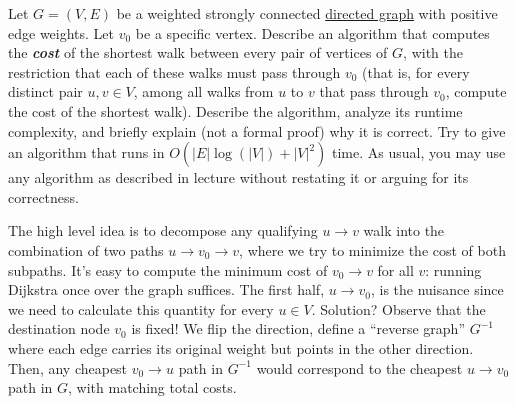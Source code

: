   \begin{exercise}
    Let $G = (V,E)$ be a weighted strongly connected \hyperref[def:directed-graph]{directed graph} with positive edge weights. Let $v_0$ be a specific vertex. Describe an algorithm that computes the \textbf{\textit{cost}} of the shortest walk between every pair of vertices of $G$, with the restriction that each of these walks must pass through $v_0$ (that is, for every distinct pair $u, v \in V$, among all walks from $u$ to $v$ that pass through $v_0$, compute the cost of the shortest walk). Describe the algorithm, analyze its runtime complexity, and briefly explain (not a formal proof) why it is correct. Try to give an algorithm that runs in $O (|E|\log(|V|) + |V|^2)$ time. As usual, you may use any algorithm as described in lecture without restating it or arguing for its correctness.
  \end{exercise}
  \begin{solution}
    The high level idea is to decompose any qualifying $u\to v$ walk into the combination of two paths $u\to v_0\to v$, where we try to minimize the cost of both subpaths. It's easy to compute the minimum cost of $v_0\to v$ for all $v$: running Dijkstra once over the graph suffices. The first half, $u\to v_0$, is the nuisance since we need to calculate this quantity for every $u\in V$. Solution? Observe that the destination node $v_0$ is fixed! We flip the direction, define a ``reverse graph'' $G^{-1}$ where each edge carries its original weight but points in the other direction. Then, any cheapest $v_0\to u$ path in $G^{-1}$ would correspond to the cheapest $u\to v_0$ path in $G$, with matching total costs.  
  \end{solution}


